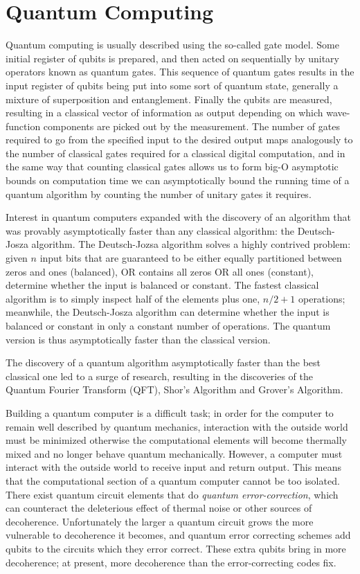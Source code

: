 \section{Quantum Computing}
Quantum computing is usually described using the so-called gate model.\cite{qc}  Some initial register of qubits is prepared, and then acted on sequentially by unitary operators known as quantum gates.  This sequence of quantum gates results in the input register of qubits being put into some sort of quantum state, generally a mixture of superposition and entanglement.  Finally the qubits are measured, resulting in a classical vector of information as output depending on which wave-function components are picked out by the measurement.  The number of gates required to go from the specified input to the desired output maps analogously to the number of classical gates required for a classical digital computation, and in the same way that counting classical gates allows us to form big-O asymptotic bounds on computation time we can asymptotically bound the running time of a quantum algorithm by counting the number of unitary gates it requires.

Interest in quantum computers expanded with the discovery of an algorithm that was provably asymptotically faster than any classical algorithm: the Deutsch-Josza algorithm.\cite{deutsch}  The Deutsch-Jozsa algorithm solves a highly contrived problem: given $n$ input bits that are guaranteed to be either equally partitioned between zeros and ones (balanced), OR contains all zeros OR all ones (constant), determine whether the input is balanced or constant.  The fastest classical algorithm is to simply inspect half of the elements plus one, $n/2 + 1$ operations; meanwhile, the Deutsch-Josza algorithm can determine whether the input is balanced or constant in only a constant number of operations.  The quantum version is thus asymptotically faster than the classical version.

The discovery of a quantum algorithm asymptotically faster than the best classical one led to a surge of research, resulting in the discoveries of the Quantum Fourier Transform (QFT)\cite{qcbook}, Shor's Algorithm\cite{shor} and Grover's Algorithm\cite{grover}.

Building a quantum computer is a difficult task;\cite{qc}\cite{qcbook} in order for the computer to remain well described by quantum mechanics, interaction with the outside world must be minimized otherwise the computational elements will become thermally mixed and no longer behave quantum mechanically.  However, a computer must interact with the outside world to receive input and return output.  This means that the computational section of a quantum computer cannot be too isolated.  There exist quantum circuit elements that do \emph{quantum error-correction},\cite{shor_error} which can counteract the deleterious effect of thermal noise or other sources of decoherence.  Unfortunately the larger a quantum circuit grows the more vulnerable to decoherence it becomes, and quantum error correcting schemes add qubits to the circuits which they error correct.  These extra qubits bring in more decoherence; at present, more decoherence than the error-correcting codes fix.

